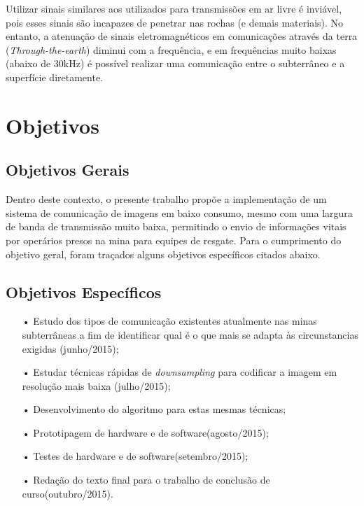 \clearpage

Utilizar sinais similares aos utilizados para transmissões em ar livre é inviável, pois esses sinais são incapazes de penetrar nas rochas (e demais materiais). No entanto, a atenuação de sinais eletromagnéticos em comunicações através da terra (\textit{Through-the-earth}) diminui com a frequência, e em frequências muito baixas (abaixo de 30kHz) é possível realizar uma comunicação entre o subterrâneo e a superfície diretamente. \cite{bandyopadhyay2010wireless}

\section{Objetivos}
\label{OBJETIVOS}
\subsection{Objetivos Gerais}

	Dentro deste contexto, o presente trabalho propõe a implementação de um sistema de comunicação de imagens em baixo consumo, mesmo com uma largura de banda de transmissão muito baixa, permitindo o envio de informações vitais por operários presos na mina para equipes de resgate. Para o cumprimento do objetivo geral, foram traçados alguns objetivos específicos citados abaixo.

\subsection{Objetivos Específicos}
\begin{itemize}
	\item[•] Estudo dos tipos de comunicação existentes atualmente nas minas subterrâneas a fim de identificar qual é o que mais se adapta às circunstancias exigidas (junho/2015);
	\item[•] Estudar técnicas rápidas de \textit{downsampling} para codificar a imagem em resolução mais baixa (julho/2015);
	\item[•] Desenvolvimento do algoritmo para estas mesmas técnicas;
	\item[•] Prototipagem de hardware e de software(agosto/2015);
	\item[•] Testes de hardware e de software(setembro/2015);
	\item[•] Redação do texto final para o trabalho de conclusão de curso(outubro/2015).
\end{itemize}
